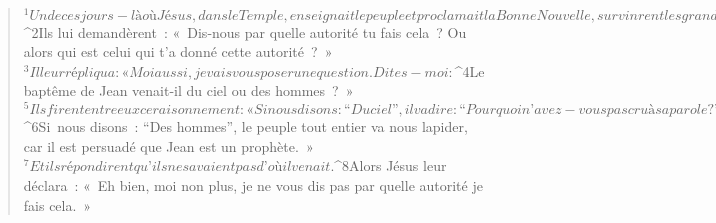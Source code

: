          
      \bchapter{}
      \begin{verse}
${}^{1}Un de ces jours-là où Jésus, dans le Temple, enseignait le peuple et proclamait la Bonne Nouvelle, survinrent les grands prêtres et les scribes avec les anciens. 
${}^{2}Ils lui demandèrent : « Dis-nous par quelle autorité tu fais cela ? Ou alors qui est celui qui t’a donné cette autorité ? » 
${}^{3}Il leur répliqua : « Moi aussi, je vais vous poser une question. Dites-moi : 
${}^{4}Le baptême de Jean venait-il du ciel ou des hommes ? » 
${}^{5}Ils firent entre eux ce raisonnement : « Si nous disons : “Du ciel”, il va dire : “Pourquoi n’avez-vous pas cru à sa parole ?” 
${}^{6}Si nous disons : “Des hommes”, le peuple tout entier va nous lapider, car il est persuadé que Jean est un prophète. » 
${}^{7}Et ils répondirent qu’ils ne savaient pas d’où il venait. 
${}^{8}Alors Jésus leur déclara : « Eh bien, moi non plus, je ne vous dis pas par quelle autorité je fais cela. »
      

\end{verse}
